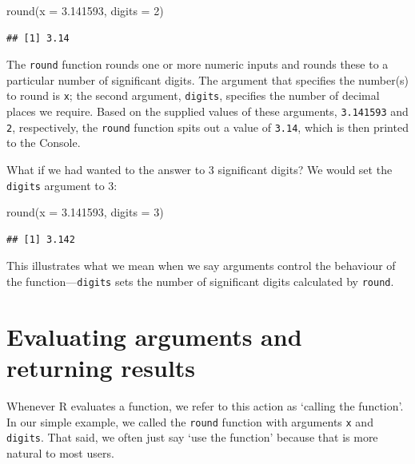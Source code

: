 \documentclass[
]{book}
\newenvironment{Shaded}{\begin{snugshade}}{\end{snugshade}}
\newcommand{\AttributeTok}[1]{\textcolor[rgb]{0.77,0.63,0.00}{#1}}
\newcommand{\DecValTok}[1]{\textcolor[rgb]{0.00,0.00,0.81}{#1}}
\newcommand{\FloatTok}[1]{\textcolor[rgb]{0.00,0.00,0.81}{#1}}
\newcommand{\FunctionTok}[1]{\textcolor[rgb]{0.00,0.00,0.00}{#1}}
\newcommand{\NormalTok}[1]{#1}
\begin{document}
\begin{Shaded}
\begin{Highlighting}[]
\FunctionTok{round}\NormalTok{(}\AttributeTok{x =} \FloatTok{3.141593}\NormalTok{, }\AttributeTok{digits =} \DecValTok{2}\NormalTok{)}
\end{Highlighting}
\end{Shaded}

\begin{verbatim}
## [1] 3.14
\end{verbatim}

The \texttt{round} function rounds one or more numeric inputs and rounds these to a particular number of significant digits. The argument that specifies the number(s) to round is \texttt{x}; the second argument, \texttt{digits}, specifies the number of decimal places we require. Based on the supplied values of these arguments, \texttt{3.141593} and \texttt{2}, respectively, the \texttt{round} function spits out a value of \texttt{3.14}, which is then printed to the Console.

What if we had wanted to the answer to 3 significant digits? We would set the \texttt{digits} argument to 3:

\begin{Shaded}
\begin{Highlighting}[]
\FunctionTok{round}\NormalTok{(}\AttributeTok{x =} \FloatTok{3.141593}\NormalTok{, }\AttributeTok{digits =} \DecValTok{3}\NormalTok{)}
\end{Highlighting}
\end{Shaded}

\begin{verbatim}
## [1] 3.142
\end{verbatim}

This illustrates what we mean when we say arguments control the behaviour of the function---\texttt{digits} sets the number of significant digits calculated by \texttt{round}.

\hypertarget{evaluating-arguments-and-returning-results}{%
\section{Evaluating arguments and returning results}\label{evaluating-arguments-and-returning-results}}

Whenever R evaluates a function, we refer to this action as `calling the function'. In our simple example, we called the \texttt{round} function with arguments \texttt{x} and \texttt{digits}. That said, we often just say `use the function' because that is more natural to most users.
\end{document}
